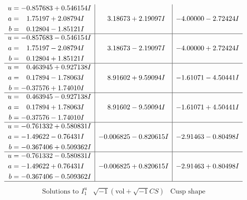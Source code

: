 \documentclass[1p]{elsarticle_modified}
\theoremstyle{definition}
\newcommand{\I}{\sqrt{-1}}
\begin{document}
$$\begin{array}{c|c|c}
\begin{aligned}
u &= -0.857683 + 0.546154 I \\
a &= \phantom{-}1.75197 + 2.08794 I \\
b &= \phantom{-}0.12804 - 1.85121 I\end{aligned}
 & \phantom{-}3.18673 + 2.19097 I & -4.00000 - 2.72424 I \\ \hline\begin{aligned}
u &= -0.857683 - 0.546154 I \\
a &= \phantom{-}1.75197 - 2.08794 I \\
b &= \phantom{-}0.12804 + 1.85121 I\end{aligned}
 & \phantom{-}3.18673 - 2.19097 I & -4.00000 + 2.72424 I \\ \hline\begin{aligned}
u &= \phantom{-}0.463945 + 0.927138 I \\
a &= \phantom{-}0.17894 - 1.78063 I \\
b &= -0.37576 + 1.74010 I\end{aligned}
 & \phantom{-}8.91602 + 9.59094 I & -1.61071 - 4.50441 I \\ \hline\begin{aligned}
u &= \phantom{-}0.463945 - 0.927138 I \\
a &= \phantom{-}0.17894 + 1.78063 I \\
b &= -0.37576 - 1.74010 I\end{aligned}
 & \phantom{-}8.91602 - 9.59094 I & -1.61071 + 4.50441 I \\ \hline\begin{aligned}
u &= -0.761332 + 0.580831 I \\
a &= -1.49622 - 0.76431 I \\
b &= -0.367406 + 0.509362 I\end{aligned}
 & -0.006825 - 0.820615 I & -2.91463 - 0.80498 I \\ \hline\begin{aligned}
u &= -0.761332 - 0.580831 I \\
a &= -1.49622 + 0.76431 I \\
b &= -0.367406 - 0.509362 I\end{aligned}
 & -0.006825 + 0.820615 I & -2.91463 + 0.80498 I\\
 \hline 
 \end{array}$$\newpage$$\begin{array}{c|c|c}  
\text{Solutions to }I^u_{1}& \I (\text{vol} + \sqrt{-1}CS) & \text{Cusp shape}\\
 \hline 
\begin{aligned}

\end{aligned}
\end{array}$$
\end{document}
